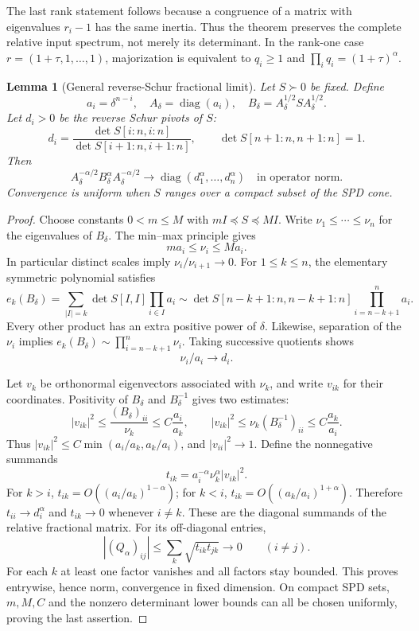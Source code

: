 \documentclass[11pt]{article}
\newtheorem{lemma}[theorem]{Lemma}
\newcommand{\diag}{\operatorname{diag}}
\begin{document}
The last rank statement follows because a congruence of a matrix with
eigenvalues $r_i-1$ has the same inertia. Thus the theorem preserves
the complete relative input spectrum, not merely its determinant.
In the rank-one case $r=(1+\tau,1,\ldots,1)$, majorization is
equivalent to $q_i\ge1$ and $\prod_iq_i=(1+\tau)^\alpha$.

\begin{lemma}[General reverse-Schur fractional limit]\label{lem:pivots}
Let $S\succ0$ be fixed. Define
\[
 a_i=\delta^{n-i},\quad A_\delta=\diag(a_i),\quad
 B_\delta=A_\delta^{1/2}S A_\delta^{1/2}.
\]
Let $d_i>0$ be the reverse Schur pivots of $S$:
\[
 d_i=\frac{\det S[i:n,i:n]}{\det S[i+1:n,i+1:n]},
 \qquad\det S[n+1:n,n+1:n]=1.
\]
Then
\[
 A_\delta^{-\alpha/2}B_\delta^\alpha A_\delta^{-\alpha/2}
 \longrightarrow\diag(d_1^\alpha,\ldots,d_n^\alpha)
 \quad\text{in operator norm}.
\]
Convergence is uniform when $S$ ranges over a compact subset of the
SPD cone.
\end{lemma}

\begin{proof}
Choose constants $0<m\le M$ with $mI\preceq S\preceq MI$.
Write $\nu_1\le\cdots\le\nu_n$ for the eigenvalues of $B_\delta$.
The min--max principle gives
\[
 ma_i\le\nu_i\le Ma_i.
\]
In particular distinct scales imply $\nu_i/\nu_{i+1}\to0$.
For $1\le k\le n$, the elementary symmetric polynomial satisfies
\[
 e_k(B_\delta)
 =\sum_{|I|=k}\det S[I,I]\prod_{i\in I}a_i
 \sim\det S[n-k+1:n,n-k+1:n]\prod_{i=n-k+1}^n a_i.
\]
Every other product has an extra positive power of $\delta$.
Likewise, separation of the $\nu_i$ implies
$e_k(B_\delta)\sim\prod_{i=n-k+1}^n\nu_i$.
Taking successive quotients shows
\[
 \nu_i/a_i\longrightarrow d_i.
\]

Let $v_k$ be orthonormal eigenvectors associated with $\nu_k$,
and write $v_{ik}$ for their coordinates. Positivity of $B_\delta$
and $B_\delta^{-1}$ gives two estimates:
\[
 |v_{ik}|^2\le\frac{(B_\delta)_{ii}}{\nu_k}
 \le C\frac{a_i}{a_k},\qquad
 |v_{ik}|^2\le\nu_k(B_\delta^{-1})_{ii}
 \le C\frac{a_k}{a_i}.
\]
Thus $|v_{ik}|^2\le C\min(a_i/a_k,a_k/a_i)$, and
$|v_{ii}|^2\to1$. Define the nonnegative summands
\[
 t_{ik}=a_i^{-\alpha}\nu_k^\alpha|v_{ik}|^2.
\]
For $k>i$, $t_{ik}=O((a_i/a_k)^{1-\alpha})$; for $k<i$,
$t_{ik}=O((a_k/a_i)^{1+\alpha})$. Therefore
$t_{ii}\to d_i^\alpha$ and $t_{ik}\to0$ whenever $i\ne k$.
These are the diagonal summands of the relative fractional matrix.
For its off-diagonal entries,
\[
 |(Q_\alpha)_{ij}|\le\sum_k\sqrt{t_{ik}t_{jk}}\to0
 \qquad(i\ne j).
\]
For each $k$ at least one factor vanishes and all factors stay bounded.
This proves entrywise, hence norm, convergence in fixed dimension.
On compact SPD sets, $m,M,C$ and the nonzero determinant lower bounds
can all be chosen uniformly, proving the last assertion.
\end{proof}
\end{document}
